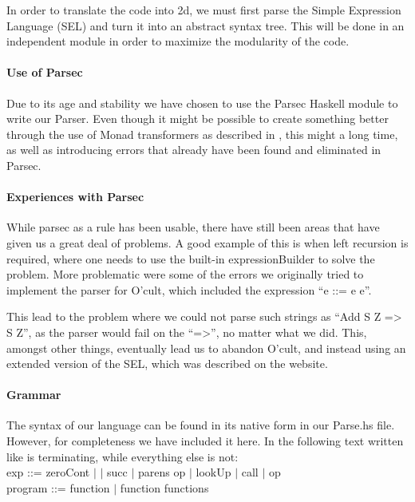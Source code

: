 In order to translate the code into 2d, we must first parse the Simple
Expression Language (SEL) and turn it into an abstract syntax
tree. This will be done in an independent module in order to maximize
the modularity of the code.

\paragraph{Use of Parsec}
Due to its age and stability we have chosen to use the Parsec Haskell
module to write our Parser. Even though it might be possible to create
something better through the use of Monad transformers as described in
\cite{partial+parsing}, this might a long time, as well as introducing
errors that already have been found and eliminated in Parsec.

\paragraph{Experiences with Parsec}
While parsec as a rule has been usable, there have still been areas that have given us a great deal of problems. A
good example of this is when left recursion is required, where one
needs to use the built-in expressionBuilder to solve the problem. More
problematic were some of the errors we originally tried to implement
the parser for O'cult, which included the expression ``e ::= e e''.

This lead to the problem where we could not parse such strings as
``Add S Z => S Z'', as the parser would fail on the ``=>'', no matter
what we did. This, amongst other things, eventually lead us to abandon
O'cult, and instead using an extended version of the SEL, which was described on the website.

\paragraph{Grammar}
The syntax of our language can be found in its native form in our
Parse.hs file. However, for completeness we have included it here. In
the following text written like  is terminating, while
everything else is not:\\

exp ::= zeroCont $\mid$  $\mid$ succ $\mid$ parens op $\mid$ lookUp $\mid$ call $\mid$ op\\

program ::= function $\mid$ function functions\\

